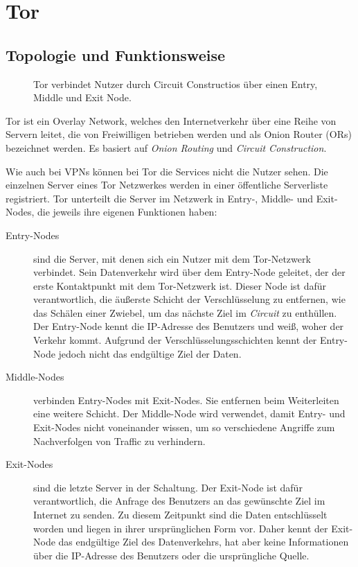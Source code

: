 \section{Tor}
\label{chap:tor}

\subsection{Topologie und Funktionsweise}
\label{chap:tor_topology}
 
\begin{figure}[h!]
    \centering
    
    \caption{Tor verbindet Nutzer durch Circuit Constructios über einen Entry, Middle und Exit Node.}
    \label{imgs:tor}
\end{figure}

Tor ist ein Overlay Network, welches den Internetverkehr über eine Reihe von Servern leitet, die von Freiwilligen betrieben werden und als Onion Router (ORs) bezeichnet werden. Es basiert auf \textit{Onion Routing} und \textit{Circuit Construction}\cite{TorWhitePaper}.

Wie auch bei VPNs können bei Tor die Services nicht die Nutzer sehen. Die einzelnen Server eines Tor Netzwerkes werden in einer öffentliche Serverliste registriert\cite{CorrelationAttackTor}. Tor unterteilt die Server im Netzwerk in Entry-, Middle- und Exit-Nodes, die jeweils ihre eigenen Funktionen haben:

\begin{description}
    \item[Entry-Nodes] sind die Server, mit denen sich ein Nutzer mit dem Tor-Netzwerk verbindet. Sein Datenverkehr wird über dem Entry-Node geleitet, der der erste Kontaktpunkt mit dem Tor-Netzwerk ist. Dieser Node ist dafür verantwortlich, die äußerste Schicht der Verschlüsselung zu entfernen, wie das Schälen einer Zwiebel, um das nächste Ziel im \textit{Circuit} zu enthüllen. Der Entry-Node kennt die IP-Adresse des Benutzers und weiß, woher der Verkehr kommt. Aufgrund der Verschlüsselungsschichten kennt der Entry-Node jedoch nicht das endgültige Ziel der Daten.
    \item[Middle-Nodes] verbinden Entry-Nodes mit Exit-Nodes. Sie entfernen beim Weiterleiten eine weitere Schicht. Der Middle-Node wird verwendet, damit Entry- und Exit-Nodes nicht voneinander wissen, um so verschiedene Angriffe zum Nachverfolgen von Traffic zu verhindern.
    \item[Exit-Nodes] sind  die letzte Server in der Schaltung. Der Exit-Node ist dafür verantwortlich, die Anfrage des Benutzers an das gewünschte Ziel im Internet zu senden. Zu diesem Zeitpunkt sind die Daten entschlüsselt worden und liegen in ihrer ursprünglichen Form vor. Daher kennt der Exit-Node das endgültige Ziel des Datenverkehrs, hat aber keine Informationen über die IP-Adresse des Benutzers oder die ursprüngliche Quelle.
\end{description}

